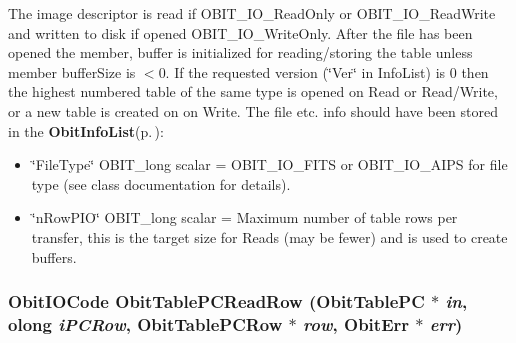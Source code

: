 The image descriptor is read if OBIT\_\-IO\_\-Read\-Only or OBIT\_\-IO\_\-Read\-Write and written to disk if opened OBIT\_\-IO\_\-Write\-Only. After the file has been opened the member, buffer is initialized for reading/storing the table unless member buffer\-Size is $<$0. If the requested version (\char`\"{}Ver\char`\"{} in Info\-List) is 0 then the highest numbered table of the same type is opened on Read or Read/Write, or a new table is created on on Write. The file etc. info should have been stored in the {\bf Obit\-Info\-List}{\rm (p.\,\pageref{structObitInfoList})}: \begin{itemize}
\item \char`\"{}File\-Type\char`\"{} OBIT\_\-long scalar = OBIT\_\-IO\_\-FITS or OBIT\_\-IO\_\-AIPS for file type (see class documentation for details). \item \char`\"{}n\-Row\-PIO\char`\"{} OBIT\_\-long scalar = Maximum number of table rows per transfer, this is the target size for Reads (may be fewer) and is used to create buffers. 
\end{itemize}
\subsubsection{\setlength{\rightskip}{0pt plus 5cm}Obit\-IOCode Obit\-Table\-PCRead\-Row ({\bf Obit\-Table\-PC} $\ast$ {\em in}, {\bf olong} {\em i\-PCRow}, {\bf Obit\-Table\-PCRow} $\ast$ {\em row}, {\bf Obit\-Err} $\ast$ {\em err})}\label{ObitTablePC_8c_a22}


